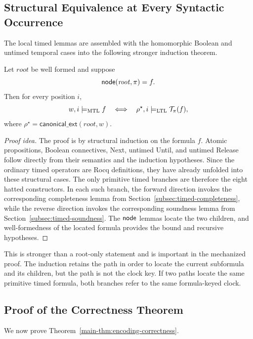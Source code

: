 \subsection{Structural Equivalence at Every Syntactic Occurrence}
\label{subsec:structural-equivalence}

The local timed lemmas are assembled with the homomorphic Boolean and untimed temporal
cases into the following stronger induction theorem.

\begin{theorem}
\label{thm:canonical-all}
Let $\mathit{root}$ be well formed and suppose
\[
  \mathsf{node}(\mathit{root},\pi)=f.
\]
Then for every position $i$,
\[
  w,i\models_{\mathrm{MTL}} f
  \quad\Longleftrightarrow\quad
  \rho^\star,i\models_{\mathrm{LTL}}\mathcal{T}_\pi(f),
\]
where $\rho^\star=\mathsf{canonical\_ext}(\mathit{root},w)$.
\end{theorem}

\begin{proof}[Proof idea]
The proof is by structural induction on the formula $f$.  Atomic propositions,
Boolean connectives, Next, untimed Until, and untimed Release follow directly
from their semantics and the induction hypotheses.  Since the ordinary timed
operators are Rocq definitions, they have already unfolded into these structural
cases.  The only primitive timed branches are therefore the eight hatted
constructors.  In each such branch, the forward direction invokes the
corresponding completeness lemma from
Section~\ref{subsec:timed-completeness}, while the reverse direction invokes
the corresponding soundness lemma from
Section~\ref{subsec:timed-soundness}.  The $\mathsf{node}$ lemmas locate the two
children, and well-formedness of the located formula provides the bound and
recursive hypotheses.
\end{proof}

This is stronger than a root-only statement and is important in the mechanized
proof.  The induction retains the path in order to locate the current subformula
and its children, but the path is not the clock key.  If two paths locate the
same primitive timed formula, both branches refer to the same formula-keyed
clock.

\subsection{Proof of the Correctness Theorem}
\label{subsec:proof-main-theorem}
We now prove Theorem~\ref{main-thm:encoding-correctness}.

